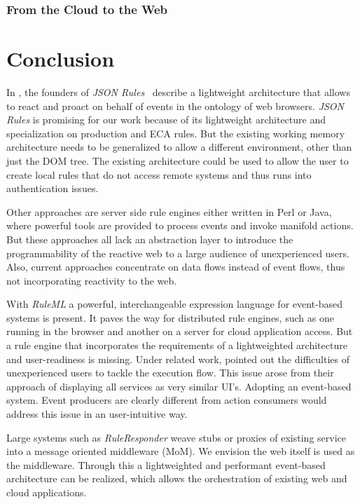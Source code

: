 \documentclass[11pt]{article}%
\begin{document}
\subsubsection{From the Cloud to the Web}


\section{Conclusion}
In \cite{2009-Pascalau_Giurca-LWAECARE.pdf}, the founders of \emph{JSON Rules}~\cite{2008-Giurca_Pascalau-JSON_Rules.pdf} describe a lightweight architecture that allows to react and proact on behalf of events in the ontology of web browsers. \emph{JSON Rules} is promising for our work because of its lightweight architecture and specialization on production and ECA rules. But the existing working memory architecture needs to be generalized to allow a different environment, other than just the DOM tree. The existing architecture could be used to allow the user to create local rules that do not access remote systems and thus runs into authentication issues.

Other approaches are server side rule engines either written in Perl or Java, where powerful tools are provided to process events and invoke manifold actions. But these approaches all lack an abstraction layer to introduce the programmability of the reactive web to a large audience of unexperienced users. Also, current approaches concentrate on data flows instead of event flows, thus not incorporating reactivity to the web.

With \emph{RuleML} a powerful, interchangeable expression language for event-based systems is present. It paves the way for distributed rule engines, such as one running in the browser and another on a server for cloud application access. But a rule engine that incorporates the requirements of a lightweighted architecture and user-readiness is missing. Under related work, \cite{2010-Namoun_etal-EURCW.pdf} pointed out the difficulties of unexperienced users to tackle the execution flow. This issue arose from their approach of displaying all services as very similar UI's. Adopting an event-based system. Event producers are clearly different from action consumers would address this issue in an user-intuitive way.

Large systems such as \emph{RuleResponder} weave stubs or proxies of existing service into a message oriented middleware (MoM). We envision the web itself is used as the middleware. Through this a lightweighted and performant event-based architecture can be realized, which allows the orchestration of existing web and cloud applications.
\end{document}
